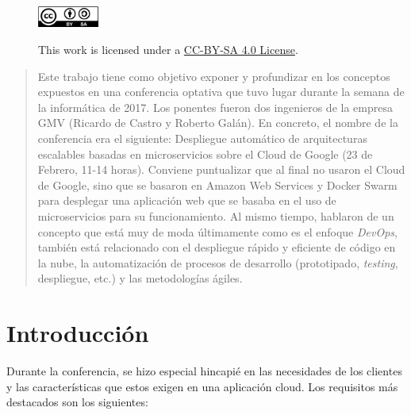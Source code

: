 \begin{titlepage}

\vfill %



\captionsetup[figure]{labelformat=empty,justification=raggedright,singlelinecheck=false}
\begin{figure}[h]

        \includegraphics[width=2cm,keepaspectratio]{cc-by-sa.png}
        \label{fig:by-sa}
        \caption{ This work is licensed under a \href{https://creativecommons.org/licenses/by/4.0/legalcode}{CC-BY-SA 4.0 License}.}

\end{figure}

\end{titlepage}

\printindex

\begin{abstract}
Este trabajo tiene como objetivo exponer y profundizar en los conceptos expuestos en una conferencia optativa que tuvo lugar durante la semana de la informática de 2017. Los ponentes fueron dos ingenieros de la empresa GMV (Ricardo de Castro y Roberto Galán). En concreto, el nombre de la conferencia era el siguiente: Despliegue automático de arquitecturas escalables basadas en microservicios sobre el Cloud de Google (23 de Febrero, 11-14 horas). Conviene puntualizar que al final no usaron el Cloud de Google, sino que se basaron en Amazon Web Services y Docker Swarm para desplegar una aplicación web que se basaba en el uso de microservicios para su funcionamiento. Al mismo tiempo, hablaron de un concepto que está muy de moda últimamente como es el enfoque \emph{DevOps}, también está relacionado con el despliegue rápido y eficiente de código en la nube, la automatización de procesos de desarrollo (prototipado, \emph{testing}, despliegue, etc.) y las metodologías ágiles.
\end{abstract}

\section{Introducción}

Durante la conferencia, se hizo especial hincapié en las necesidades de los clientes y las características que estos exigen en una aplicación cloud. Los requisitos más destacados son los siguientes:


